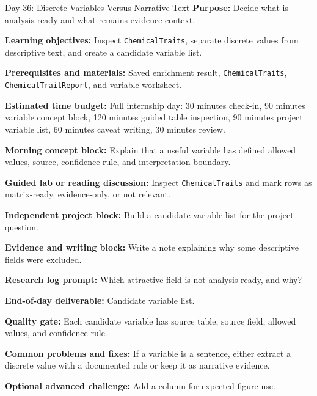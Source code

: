 \begin{dailybox}{Day 36: Discrete Variables Versus Narrative Text}
\textbf{Purpose:} Decide what is analysis-ready and what remains evidence context.

\textbf{Learning objectives:} Inspect \texttt{ChemicalTraits}, separate discrete values from descriptive text, and create a candidate variable list.

\textbf{Prerequisites and materials:} Saved enrichment result, \texttt{ChemicalTraits}, \texttt{ChemicalTraitReport}, and variable worksheet.

\textbf{Estimated time budget:} Full internship day: 30 minutes check-in, 90 minutes variable concept block, 120 minutes guided table inspection, 90 minutes project variable list, 60 minutes caveat writing, 30 minutes review.

\textbf{Morning concept block:} Explain that a useful variable has defined allowed values, source, confidence rule, and interpretation boundary.

\textbf{Guided lab or reading discussion:} Inspect \texttt{ChemicalTraits} and mark rows as matrix-ready, evidence-only, or not relevant.

\textbf{Independent project block:} Build a candidate variable list for the project question.

\textbf{Evidence and writing block:} Write a note explaining why some descriptive fields were excluded.

\textbf{Research log prompt:} Which attractive field is not analysis-ready, and why?

\textbf{End-of-day deliverable:} Candidate variable list.

\textbf{Quality gate:} Each candidate variable has source table, source field, allowed values, and confidence rule.

\textbf{Common problems and fixes:} If a variable is a sentence, either extract a discrete value with a documented rule or keep it as narrative evidence.

\textbf{Optional advanced challenge:} Add a column for expected figure use.
\end{dailybox}

